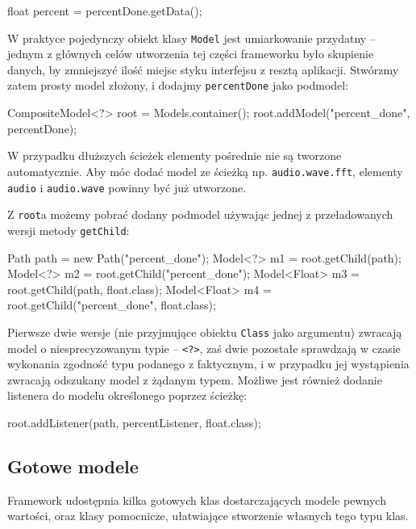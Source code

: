 \begin{java}
float percent = percentDone.getData();
\end{java}

W praktyce pojedynczy obiekt klasy \texttt{Model} jest umiarkowanie przydatny -- jednym z głównych
celów utworzenia tej części frameworku było skupienie danych, by zmniejszyć ilość miejsc styku
interfejsu z resztą aplikacji. Stwórzmy zatem prosty model złożony, i dodajmy \texttt{percentDone}
jako podmodel:

\begin{java}
CompositeModel<?> root = Models.container();
root.addModel("percent_done", percentDone);
\end{java}

\begin{Caution}
W przypadku dłuższych ścieżek elementy pośrednie nie są tworzone automatycznie. Aby móc dodać model
ze ścieżką np. \texttt{audio.wave.fft}, elementy \texttt{audio} i \texttt{audio.wave} powinny być
już utworzone.  \end{Caution}

Z \texttt{root}a możemy pobrać dodany podmodel używając jednej z przeładowanych wersji metody
\texttt{getChild}:

\begin{java}
Path path = new Path("percent_done");
Model<?> m1 = root.getChild(path);
Model<?> m2 = root.getChild("percent_done");
Model<Float> m3 = root.getChild(path, float.class);
Model<Float> m4 = root.getChild("percent_done", float.class);
\end{java}

Pierwsze dwie wersje (nie przyjmujące obiektu \texttt{Class} jako argumentu) zwracają model o
niesprecyzowanym typie -- \texttt{<?>}, zaś dwie pozostałe sprawdzają w czasie wykonania zgodność
typu podanego z faktycznym, i w przypadku jej wystąpienia zwracają odszukany model z żądanym typem.
Możliwe jest również dodanie listenera do modelu określonego poprzez ścieżkę:

\begin{java}
root.addListener(path, percentListener, float.class);
\end{java}


\subsection{Gotowe modele}

Framework udostępnia kilka gotowych klas dostarczających modele pewnych wartości, oraz klasy
pomocnicze, ułatwiające stworzenie własnych tego typu klas.

